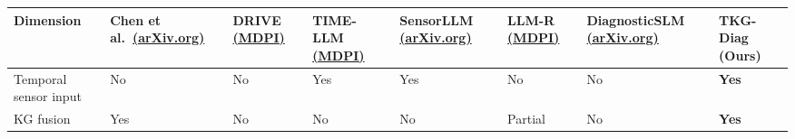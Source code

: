 \documentclass[
  11pt,
]{article}
\newcounter{none} %
\begin{document}
{\def\LTcaptype{none} %
\begin{longtable}[]{@{}
  >{\raggedright\arraybackslash}p{}
  >{\centering\arraybackslash}p{}
  >{\centering\arraybackslash}p{}
  >{\centering\arraybackslash}p{}
  >{\centering\arraybackslash}p{}
  >{\centering\arraybackslash}p{}
  >{\centering\arraybackslash}p{}
  >{\centering\arraybackslash}p{}@{}}
\toprule\noalign{}
\begin{minipage}[b]{\linewidth}\raggedright
Dimension
\end{minipage} & \begin{minipage}[b]{\linewidth}\centering
Chen et al.~\href{https://arxiv.org/html/2411.14256v1}{(arXiv.org)}
\end{minipage} & \begin{minipage}[b]{\linewidth}\centering
DRIVE \href{https://www.mdpi.com/2079-9292/14/21/4180}{(MDPI)}
\end{minipage} & \begin{minipage}[b]{\linewidth}\centering
TIME-LLM \href{https://www.mdpi.com/1424-8220/25/19/6163}{(MDPI)}
\end{minipage} & \begin{minipage}[b]{\linewidth}\centering
SensorLLM \href{https://arxiv.org/html/2505.19381v1}{(arXiv.org)}
\end{minipage} & \begin{minipage}[b]{\linewidth}\centering
LLM-R \href{https://www.mdpi.com/1424-8220/25/19/6033}{(MDPI)}
\end{minipage} & \begin{minipage}[b]{\linewidth}\centering
DiagnosticSLM \href{https://arxiv.org/pdf/2507.15025}{(arXiv.org)}
\end{minipage} & \begin{minipage}[b]{\linewidth}\centering
\textbf{TKG-Diag (Ours)}
\end{minipage} \\
\midrule\noalign{}
\endhead
\bottomrule\noalign{}
\endlastfoot
Temporal sensor input & No & No & Yes & Yes & No & No & \textbf{Yes} \\
KG fusion & Yes & No & No & No & Partial & No & \textbf{Yes} \\

\end{longtable}}
\end{document}
